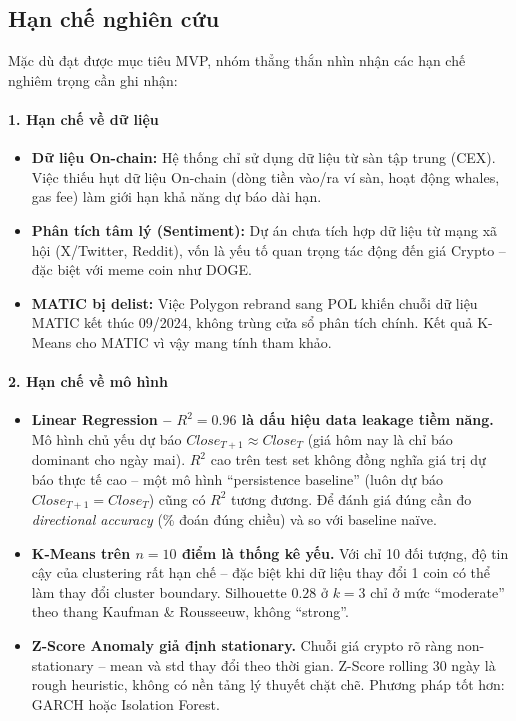 \subsection{Hạn chế nghiên cứu}

Mặc dù đạt được mục tiêu MVP, nhóm thẳng thắn nhìn nhận các hạn chế nghiêm trọng cần ghi nhận:

\paragraph{1. Hạn chế về dữ liệu}
\begin{itemize}
    \item \textbf{Dữ liệu On-chain:} Hệ thống chỉ sử dụng dữ liệu từ sàn tập trung (CEX). Việc thiếu hụt dữ liệu On-chain (dòng tiền vào/ra ví sàn, hoạt động whales, gas fee) làm giới hạn khả năng dự báo dài hạn.
    \item \textbf{Phân tích tâm lý (Sentiment):} Dự án chưa tích hợp dữ liệu từ mạng xã hội (X/Twitter, Reddit), vốn là yếu tố quan trọng tác động đến giá Crypto -- đặc biệt với meme coin như DOGE.
    \item \textbf{MATIC bị delist:} Việc Polygon rebrand sang POL khiến chuỗi dữ liệu MATIC kết thúc 09/2024, không trùng cửa sổ phân tích chính. Kết quả K-Means cho MATIC vì vậy mang tính tham khảo.
\end{itemize}

\paragraph{2. Hạn chế về mô hình}
\begin{itemize}
    \item \textbf{Linear Regression -- $R^2 = 0.96$ là dấu hiệu data leakage tiềm năng.} Mô hình chủ yếu dự báo $Close_{T+1} \approx Close_T$ (giá hôm nay là chỉ báo dominant cho ngày mai). $R^2$ cao trên test set không đồng nghĩa giá trị dự báo thực tế cao -- một mô hình ``persistence baseline'' (luôn dự báo $Close_{T+1} = Close_T$) cũng có $R^2$ tương đương. Để đánh giá đúng cần đo \emph{directional accuracy} (\% đoán đúng chiều) và so với baseline naïve.
    \item \textbf{K-Means trên $n = 10$ điểm là thống kê yếu.} Với chỉ 10 đối tượng, độ tin cậy của clustering rất hạn chế -- đặc biệt khi dữ liệu thay đổi 1 coin có thể làm thay đổi cluster boundary. Silhouette $0.28$ ở $k = 3$ chỉ ở mức ``moderate'' theo thang Kaufman \& Rousseeuw, không ``strong''.
    \item \textbf{Z-Score Anomaly giả định stationary.} Chuỗi giá crypto rõ ràng non-stationary -- mean và std thay đổi theo thời gian. Z-Score rolling 30 ngày là rough heuristic, không có nền tảng lý thuyết chặt chẽ. Phương pháp tốt hơn: GARCH \cite{hyndman2021} hoặc Isolation Forest.
\end{itemize}

